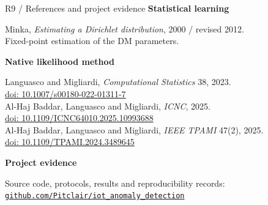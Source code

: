 \documentclass[aspectratio=169,10pt]{beamer}
\begin{document}
\begin{frame}[label=reference-sources]{R9 / References and project evidence}
\small
\textbf{Statistical learning}\par\smallskip
Minka, \emph{Estimating a Dirichlet distribution}, 2000 / revised 2012.\\
Fixed-point estimation of the DM parameters.
\par\medskip
\textbf{Native likelihood method}\par\smallskip
Languasco and Migliardi, \emph{Computational Statistics} 38, 2023.\\
\href{https://doi.org/10.1007/s00180-022-01311-7}{doi: 10.1007/s00180-022-01311-7}\\
Al-Haj Baddar, Languasco and Migliardi, \emph{ICNC}, 2025.\\
\href{https://doi.org/10.1109/ICNC64010.2025.10993688}{doi: 10.1109/ICNC64010.2025.10993688}\\
Al-Haj Baddar, Languasco and Migliardi, \emph{IEEE TPAMI} 47(2), 2025.\\
\href{https://doi.org/10.1109/TPAMI.2024.3489645}{doi: 10.1109/TPAMI.2024.3489645}
\par\smallskip
\textbf{Project evidence}\par\smallskip
Source code, protocols, results and reproducibility records:\\
\href{https://github.com/Pitclair/iot_anomaly_detection}
  {\texttt{github.com/Pitclair/iot\_anomaly\_detection}}
\end{frame}
\end{document}
